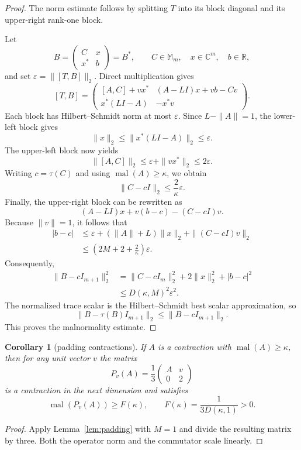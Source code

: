 \documentclass[11pt]{article}
\newtheorem{corollary}{Corollary}
\newcommand{\mal}{\operatorname{mal}}
\newcommand{\M}{\mathbb M}
\begin{document}
\begin{proof}
The norm estimate follows by splitting $T$ into its block diagonal and its
upper-right rank-one block.

Let
\[
 B=\begin{pmatrix}C&x\\x^*&b\end{pmatrix}=B^*,
 \qquad C\in\M_m,\quad x\in\mathbb C^m,\quad b\in\mathbb R,
\]
and set $\varepsilon=\|[T,B]\|_2$.  Direct multiplication gives
\[
 [T,B]=
 \begin{pmatrix}
 [A,C]+vx^* &(A-LI)x+vb-Cv\\
 x^*(LI-A)&-x^*v
 \end{pmatrix}.
\]
Each block has Hilbert--Schmidt norm at most $\varepsilon$.  Since
$L-\|A\|=1$, the lower-left block gives
\[
 \|x\|_2\leq\|x^*(LI-A)\|_2\leq\varepsilon.
\]
The upper-left block now yields
\[
 \|[A,C]\|_2\leq\varepsilon+\|vx^*\|_2\leq2\varepsilon.
\]
Writing $c=\tau(C)$ and using $\mal(A)\geq\kappa$, we obtain
\[
                    \|C-cI\|_2\leq\frac{2}{\kappa}\varepsilon.
\]
Finally, the upper-right block can be rewritten as
\[
 (A-LI)x+v(b-c)-(C-cI)v.
\]
Because $\|v\|=1$, it follows that
\begin{align*}
 |b-c|
 &\leq\varepsilon+(\|A\|+L)\|x\|_2+\|(C-cI)v\|_2\\
 &\leq\left(2M+2+\frac2\kappa\right)\varepsilon.
\end{align*}
Consequently,
\begin{align*}
 \|B-cI_{m+1}\|_2^2
 &=\|C-cI_m\|_2^2+2\|x\|_2^2+|b-c|^2\\
 &\leq D(\kappa,M)^2\varepsilon^2.
\end{align*}
The normalized trace scalar is the Hilbert--Schmidt best scalar
approximation, so
\[
 \|B-\tau(B)I_{m+1}\|_2\leq\|B-cI_{m+1}\|_2.
\]
This proves the malnormality estimate.
\end{proof}

\begin{corollary}[padding contractions]\label{cor:padding}
If $A$ is a contraction with $\mal(A)\geq\kappa$, then for any unit vector
$v$ the matrix
\[
             P_v(A)=\frac13\begin{pmatrix}A&v\\0&2\end{pmatrix}
\]
is a contraction in the next dimension and satisfies
\[
 \mal(P_v(A))\geq F(\kappa),\qquad
 F(\kappa)=\frac{1}{3D(\kappa,1)}>0.
\]
\end{corollary}

\begin{proof}
Apply Lemma~\ref{lem:padding} with $M=1$ and divide the resulting matrix by
three.  Both the operator norm and the commutator scale linearly.
\end{proof}
\end{document}
